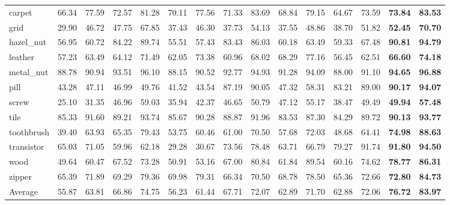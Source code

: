 \documentclass[letterpaper]{article} %
\begin{document}
\begin{table*}[htbp]
{\begin{tabular}{l|cc|cc|cc|cc|cc|cc|cc}
carpet & 66.34 & 77.59 & 72.57 & 81.28 & 70.11 & 77.56 & 71.33 & 83.69 & 68.84 & 79.15 & 64.67 & 73.59 &\textbf{73.84} &\textbf{83.53} \\
grid & 29.90 & 46.72 & 47.75 & 67.85 & 37.43 & 46.30 & 37.73 & 54.13 & 37.55 & 48.86 & 38.70 & 51.82 &\textbf{52.45} &\textbf{70.70} \\
hazel\_nut & 56.95 & 60.72 & 84.22 & 89.74 & 55.51 & 57.43 & 83.43 & 86.03 & 60.18 & 63.49 & 59.33 & 67.48 &\textbf{90.81} &\textbf{94.79} \\
leather & 57.23 & 63.49 & 64.12 & 71.49 & 62.05 & 73.38 & 60.96 & 68.02 & 68.29 & 77.16 & 56.45 & 62.51 &\textbf{66.60} &\textbf{74.18} \\
metal\_nut & 88.78 & 90.94 & 93.51 & 96.10 & 88.15 & 90.52 & 92.77 & 94.93 & 91.28 & 94.09 & 88.00 & 91.10 &\textbf{94.65} &\textbf{96.88} \\
pill & 43.28 & 47.11 & 46.99 & 49.76 & 41.52 & 43.54 & 87.19 & 90.05 & 47.32 & 58.31 & 83.21 & 89.00 &\textbf{90.17} &\textbf{94.07} \\
screw & 25.10 & 31.35 & 46.96 & 59.03 & 35.94 & 42.37 & 46.65 & 50.79 & 47.12 & 55.17 & 38.47 & 49.49 &\textbf{49.94} &\textbf{57.48} \\
tile & 85.33 & 91.60 & 89.21 & 93.74 & 85.67 & 90.28 & 88.87 & 91.96 & 83.53 & 87.30 & 84.29 & 89.72 &\textbf{90.13} &\textbf{93.77} \\
toothbrush & 39.40 & 63.93 & 65.35 & 79.43 & 53.75 & 60.46 & 61.00 & 70.50 & 57.68 & 72.03 & 48.68 & 64.41 &\textbf{74.98} &\textbf{88.63} \\
transistor & 65.03 & 71.05 & 59.96 & 62.18 & 29.28 & 30.67 & 73.56 & 78.48 & 63.71 & 66.79 & 79.27 & 91.74 &\textbf{91.80} &\textbf{94.50} \\
wood & 49.64 & 60.47 & 67.52 & 73.28 & 50.91 & 53.16 & 67.00 & 80.84 & 61.84 & 89.54 & 60.16 & 74.62 &\textbf{78.77} &\textbf{86.31} \\
zipper & 65.39 & 71.89 & 69.29 & 79.36 & 69.98 & 79.31 & 66.34 & 70.50 & 68.78 & 78.50 & 65.36 & 72.66 &\textbf{72.80} &\textbf{84.73} \\ \hline
Average 
& 55.87 & 63.81 
& 66.86 & 74.75 
& 56.23 & 61.44 
& 67.71 & 72.07 
& 62.89 & 71.70 
& 62.88 & 72.06 
&\textbf{76.72} &\textbf{83.97} \\ \hline

\end{tabular}
}
\label{Segformer_mvtec}
\end{table*}
\end{document}
